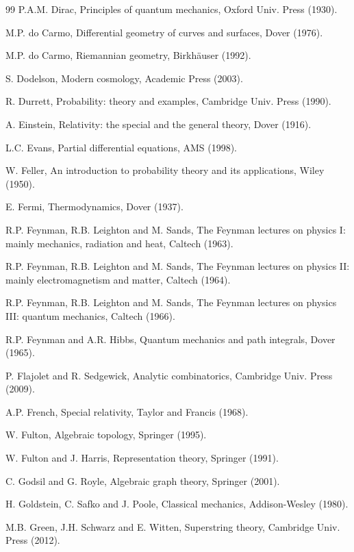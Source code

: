 \documentclass[12pt]{amsbook}
\begin{document}
\begin{thebibliography}{99}
P.A.M. Dirac, Principles of quantum mechanics, Oxford Univ. Press (1930).

M.P. do Carmo, Differential geometry of curves and surfaces, Dover (1976).

M.P. do Carmo, Riemannian geometry, Birkh\"auser (1992).

S. Dodelson, Modern cosmology, Academic Press (2003).

R. Durrett, Probability: theory and examples, Cambridge Univ. Press (1990).

A. Einstein, Relativity: the special and the general theory, Dover (1916).

L.C. Evans, Partial differential equations, AMS (1998).

W. Feller, An introduction to probability theory and its applications, Wiley (1950).

E. Fermi, Thermodynamics, Dover (1937). 

R.P. Feynman, R.B. Leighton and M. Sands, The Feynman lectures on physics I: mainly mechanics, radiation and heat, Caltech (1963).

R.P. Feynman, R.B. Leighton and M. Sands, The Feynman lectures on physics II: mainly electromagnetism and matter, Caltech (1964).

R.P. Feynman, R.B. Leighton and M. Sands, The Feynman lectures on physics III: quantum mechanics, Caltech (1966).

R.P. Feynman and A.R. Hibbs, Quantum mechanics and path integrals, Dover (1965).

P. Flajolet and R. Sedgewick, Analytic combinatorics, Cambridge Univ. Press (2009).

A.P. French, Special relativity, Taylor and Francis (1968). 

W. Fulton, Algebraic topology, Springer (1995).

W. Fulton and J. Harris, Representation theory, Springer (1991).

C. Godsil and G. Royle, Algebraic graph theory, Springer (2001).

H. Goldstein, C. Safko and J. Poole, Classical mechanics, Addison-Wesley (1980).

M.B. Green, J.H. Schwarz and E. Witten, Superstring theory, Cambridge Univ. Press (2012). 


\end{thebibliography}
\end{document}
